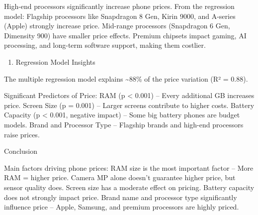 \documentclass[
]{article}
\providecommand{\tightlist}{%
  \setlength{\itemsep}{0pt}\setlength{\parskip}{0pt}}
\begin{document}
High-end processors significantly increase phone prices. From the
regression model: Flagship processors like Snapdragon 8 Gen, Kirin 9000,
and A-series (Apple) strongly increase price. Mid-range processors
(Snapdragon 6 Gen, Dimensity 900) have smaller price effects. Premium
chipsets impact gaming, AI processing, and long-term software support,
making them costlier.

\begin{enumerate}
\def\labelenumi{\arabic{enumi}.}
\setcounter{enumi}{3}
\tightlist
\item
  Regression Model Insights
\end{enumerate}

The multiple regression model explains \textasciitilde88\% of the price
variation (R² = 0.88).

Significant Predictors of Price: RAM (p \textless{} 0.001) -- Every
additional GB increases price. Screen Size (p = 0.001) -- Larger screens
contribute to higher costs. Battery Capacity (p \textless{} 0.001,
negative impact) -- Some big battery phones are budget models. Brand and
Processor Type -- Flagship brands and high-end processors raise prices.

Conclusion

Main factors driving phone prices: RAM size is the most important factor
-- More RAM = higher price. Camera MP alone doesn't guarantee higher
price, but sensor quality does. Screen size has a moderate effect on
pricing. Battery capacity does not strongly impact price. Brand name and
processor type significantly influence price -- Apple, Samsung, and
premium processors are highly priced.
\end{document}
